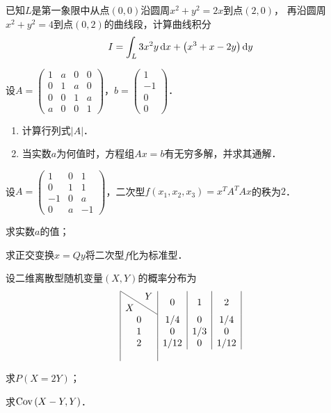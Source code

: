 \documentclass[plain,noanswer,medmath]{../../template/jnuexam}
\begin{document}
\begin{problem}[points=10]
已知$L$是第一象限中从点$\left(0,0 \right)$沿圆周$x^2 + y^2 = 2x$到点$\left(2,0 \right)$，
再沿圆周\goodbreak$x^2 + y^2 = 4$到点$\left(0,2 \right)$的曲线段，计算曲线积分
$$I=\int_L 3x^2 y\mathop{}\!\mathrm{d} x + \left(x^3 + x - 2y \right)\mathop{}\!\mathrm{d} y$$
\end{problem}


\begin{problem}[points=11]
设$A = \begin{pmatrix}
  1 & a & 0 & 0 \\
  0 & 1 & a & 0 \\
  0 & 0 & 1 & a \\
  a & 0 & 0 & 1
\end{pmatrix}$，$b = \begin{pmatrix}
  1 \\
  -1 \\
  0 \\
  0
\end{pmatrix}$．
\begin{enumerate}
\item 计算行列式$|A|$．
\item 当实数$a$为何值时，方程组$Ax = b$有无穷多解，并求其通解．
\end{enumerate}
\end{problem}


\begin{problem}[points=11]
设$A = \begin{pmatrix}
   1 & 0 & 1 \\
   0 & 1 & 1 \\
  -1 & 0 & a \\
   0 & a & -1
\end{pmatrix}$，二次型$f(x_1,x_2,x_3) = x^T A^T Ax$的秩为$2$．\par
\begin{enumerate*}
\item 求实数$a$的值；\item 求正交变换$x = Qy$将二次型$f$化为标准型．
\end{enumerate*}
\end{problem}


\begin{problem}[points=11]
设二维离散型随机变量$(X,Y)$的概率分布为
\[\begin{array}{|c|c|c|c|}
\hline
  \diagboxtwo{X}{Y} & 0    & 1   & 2    \\
\hline
       0            & 1/4  & 0   & 1/4  \\
\hline
       1            & 0    & 1/3 & 0    \\
\hline
       2            & 1/12 & 0   & 1/12 \\
\hline
\end{array}\]
\begin{enumerate*}
\item 求$P(X = 2Y)$；\item 求$\operatorname{Cov} \left(X - Y,Y \right)$．
\end{enumerate*}

\end{problem}
\end{document}
